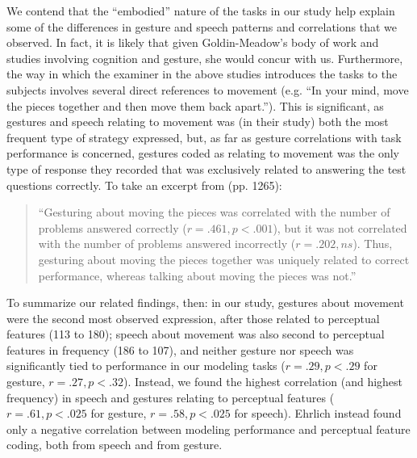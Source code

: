 We contend that the ``embodied'' nature of the tasks in our study help explain
some of the differences in gesture and speech patterns and correlations that we
observed. In fact, it is likely that given Goldin-Meadow's body of work and
studies involving cognition and gesture, she would concur with us. Furthermore,
the way in which the examiner in the above studies introduces the tasks to the
subjects involves several direct references to movement (e.g. ``In your mind,
move the pieces together and then move them back apart.''). This is significant,
as gestures and speech relating to movement was (in their study) both the most
frequent type of strategy expressed, but, as far as gesture correlations with
task performance is concerned, gestures coded as relating to movement was the
only type of response they recorded that was exclusively related to answering
the test questions correctly. To take an excerpt from
\cite{ehrlich2006importance} (pp. 1265):
\begin{quote}
``Gesturing about moving the pieces was
correlated with the number of problems answered correctly ($r = .461, p <
.001$), but it was not correlated with the number of problems answered
incorrectly ($r = .202, ns$). Thus, gesturing about moving the pieces together
was uniquely related to correct performance, whereas talking about moving the
pieces was not.''
\end{quote}  

To summarize our related findings, then: in our study, gestures about movement
were the second most observed expression, after those related to perceptual
features (113 to 180); speech about movement was also second to perceptual
features in frequency (186 to 107), and neither gesture nor speech was
significantly tied to performance in our modeling tasks ($r = .29, p < .29$ for
gesture, $r= .27, p < .32$). Instead, we found the highest correlation (and
highest frequency) in speech and gestures relating to perceptual features ($r =
.61, p < .025$ for gesture, $r = .58, p < .025$ for speech). Ehrlich instead
found only a negative correlation between modeling performance and perceptual
feature coding, both from speech and from gesture.

